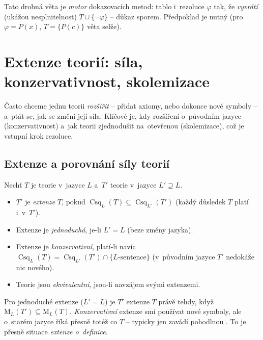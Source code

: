 \documentclass[11pt,a4paper]{article}
\newcommand{\Mset}{\mathrm{M}}              %
\newcommand{\Csq}{\operatorname{Csq}}       %
\begin{document}
\begin{intuice}
Tato drobná věta je \emph{motor} dokazovacích metod: tablo i~rezoluce  $\varphi$ tak, že \emph{vyvrátí} (ukážou nesplnitelnost) $T\cup\{\neg\varphi\}$ -- důkaz sporem. Předpoklad  je nutný (pro $\varphi=P(x)$, $T=\{P(c)\}$ věta selže).
\end{intuice}

\section{Extenze teorií: síla, konzervativnost, skolemizace}\label{sec:extenze}

Často chceme jednu teorii \emph{rozšířit} -- přidat axiomy, nebo dokonce nové symboly -- a~ptát se, jak se změní její síla. Klíčové je, kdy rozšíření  o~původním jazyce (konzervativnost) a~jak teorii zjednodušit na~otevřenou (skolemizace), což je vstupní krok rezoluce.

\subsection{Extenze a porovnání síly teorií}

\begin{definice}
Nechť $T$ je teorie v~jazyce $L$ a~$T'$ teorie v~jazyce $L'\supseteq L$.
\begin{itemize}
  \item $T'$ je \emph{extenze} $T$, pokud $\Csq_L(T)\subseteq\Csq_{L'}(T')$ (každý důsledek $T$ platí i~v~$T'$).
  \item Extenze je \emph{jednoduchá}, je-li $L'=L$ (beze změny jazyka).
  \item Extenze je \emph{konzervativní}, platí-li navíc $\Csq_L(T)=\Csq_{L'}(T')\cap\{L\text{-sentence}\}$ (v~původním jazyce $T'$ nedokáže nic nového).
  \item Teorie jsou \emph{ekvivalentní}, jsou-li navzájem svými extenzemi.
\end{itemize}
\end{definice}

\begin{intuice}
 Pro jednoduché extenze ($L'=L$) je $T'$ extenze $T$ právě tehdy, když $\Mset_L(T')\subseteq\Mset_L(T)$. \emph{Konzervativní} extenze smí používat nové symboly, ale o~starém jazyce říká přesně totéž co $T$ -- typicky jen zavádí pohodlnou . To je přesně situace \emph{extenze o~definice}.
\end{intuice}
\end{document}
